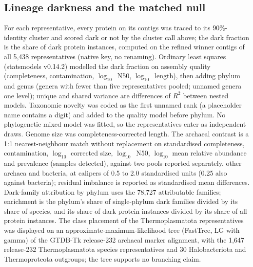\documentclass[11pt]{article}
\begin{document}
\subsection*{Lineage darkness and the matched null}
For each representative, every protein on its contigs was traced to its 90\%-identity cluster and
scored dark or not by the cluster call above; the dark fraction is the share of dark protein
instances, computed on the refined winner contigs of all 5{,}438 representatives (native key, no
renaming). Ordinary least squares (statsmodels v0.14.2) modelled the dark fraction on assembly quality
(completeness, contamination, $\log_{10}$~N50, $\log_{10}$~length), then adding phylum and genus
(genera with fewer than five representatives pooled; unnamed genera one level); unique and shared
variance are differences of $R^2$ between nested models. Taxonomic novelty was coded as the first
unnamed rank (a placeholder name contains a digit) and added to the quality model before phylum. No
phylogenetic mixed model was fitted, so the representatives enter as independent draws. Genome size
was completeness-corrected length. The archaeal contrast is a 1:1 nearest-neighbour match without
replacement on standardised completeness, contamination, $\log_{10}$ corrected size,
$\log_{10}$~N50, $\log_{10}$ mean relative abundance and prevalence (samples detected), against two
pools reported separately, other archaea and bacteria, at calipers of 0.5 to 2.0 standardised units
(0.25 also against bacteria); residual imbalance is reported as standardised mean differences. Dark-family attribution by
phylum uses the 78{,}727 attributable families; enrichment is the phylum's share of single-phylum
dark families divided by its share of species, and its share of dark protein instances divided by
its share of all protein instances. The class placement of the Thermoplasmatota representatives was
displayed on an approximate-maximum-likelihood tree (FastTree, LG with gamma) of the GTDB-Tk
release-232 archaeal marker alignment, with the 1{,}647 release-232 Thermoplasmatota species
representatives and 30 Halobacteriota and Thermoproteota outgroups; the tree supports no branching
claim.
\end{document}
